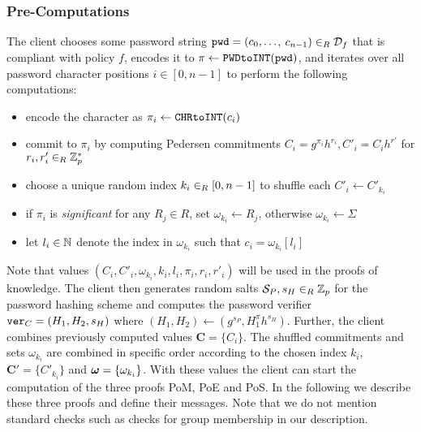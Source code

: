\subsubsection{Pre-Computations}
The client chooses some password string $\mathtt{pwd}=(c_0,\ldots$, $c_{n-1})\in_R\mathcal{D}_f$ that is compliant with policy $f$, encodes it to $\pi\gets\texttt{PWDtoINT}(\mathtt{pwd})$, and iterates over all password character positions $i\in[0,n-1]$ to perform the following computations:
\begin{itemize}
  \item encode the character as $\pi_i\gets\texttt{CHRtoINT}(c_i)$
  \item commit to $\pi_i$ by computing Pedersen commitments $C_i=g^{\pi_i}h^{r_i}, C'_i=C_i h^{r'}$ for $r_i,r'_i\in_R\mathbb{Z}^\ast_p$
  \item choose a unique random index $k_{i} \in_R[0,n-1]$ to shuffle each $C'_i\gets C'_{k_i}$
  \item if $\pi_i$ is \emph{significant} for any $R_j\in R$, set $\omega_{k_i}\gets R_j$, otherwise $\omega_{k_i}\gets\Sigma$
  \item let $l_i\in\mathbb{N}$ denote the index in $\omega_{k_i}$ such that $c_i=\omega_{k_i}[l_i]$
\end{itemize}
Note that values $(C_i, C'_i, \omega_{k_i}, k_{i}, l_i, \pi_i, r_i, r'_i)$ will be used in the proofs of knowledge.
The client then generates random salts $\mathcal{S}_P,s_H\in_R\mathbb{Z}_p$ for the password hashing scheme and computes the password verifier $\mathtt{ver}_C=(H_1, H_2, s_H)$ where $(H_1,H_2)\gets (g^{s_P}, H_1^\pi h^{s_H})$.
Further, the client combines previously computed values $\bm C = \{C_{i}\}$.
The shuffled commitments and sets $\omega_{k_i}$ are combined in specific order according to the chosen index $k_i$, \ie $\bm C' = \{C'_{k_{i}}\}$ and $\boldsymbol{\mathbf{\omega}} = \{\omega_{k_i}\}$.
With these values the client can start the computation of the three proofs \ac{PoM}, \ac{PoE} and \ac{PoS}.
In the following we describe these three proofs and define their messages. Note that we do not mention standard checks such as checks for group membership in our description.


